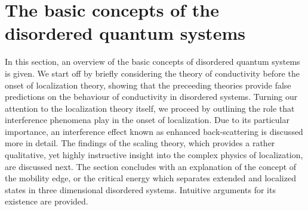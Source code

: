 \documentclass[10pt,a4paper]{article}
\begin{document}
\section{The basic concepts of the disordered quantum systems}
\label{sec:basic}
In this section, an overview of the basic concepts of disordered quantum systems is given. We start off by briefly considering the theory of conductivity before the onset of localization theory, showing that the preceeding theories provide false predictions on the behaviour of conductivity in disordered systems. Turning our attention to the localization theory itself, we proceed by outlining the role that interference phenomena play in the onset of localization. Due to its particular importance, an interference effect known as enhanced back-scattering is discussed more in detail. The findings of the scaling theory, which provides a rather qualitative, yet highly instructive insight into the complex physics of localization, are discussed next. The section concludes with an explanation of the concept of the mobility edge, or the critical energy which separates extended and localized states in three dimensional disordered systems. Intuitive arguments for its existence are provided. 
\end{document}
